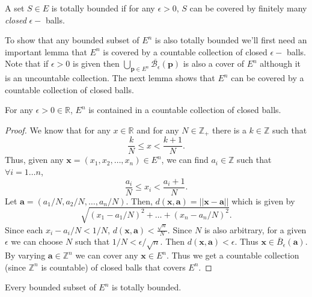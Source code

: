\begin{Definition}
    A set $S \in E$ is totally bounded if for any $\epsilon > 0$, $S$ can be covered by finitely
    many \emph{closed} $\epsilon -$ balls.
\end{Definition}
To show that any bounded subset of $E^n$ is also totally bounded we'll first need an important lemma
that $E^n$ is covered by a countable collection of closed $\epsilon -$ balls. Note that if $\epsilon
> 0$ is given then $\bigcup_{\mathbf{p} \in E^n}\overline{\mathcal{B}_{\epsilon}}(\mathbf{p})$ is
also a cover of $E^n$ although it is an uncountable collection. The next lemma shows that $E^n$ can
be covered by a countable collection of closed balls.
\begin{Lemma}[name=Covering $E^n$ by a countable collection of closed balls]
    For any $\epsilon > 0 \in \mathbb{R}$, $E^n$ is contained in a countable collection of closed
    balls.
\end{Lemma}
\begin{proof}
    We know that for any $x \in \mathbb{R}$ and for any $N \in \mathbb{Z}_+$ there is a $k \in
    \mathbb{Z}$ such that \[ \frac{k}{N} \leq x < \frac{k+1}{N} .\] Thus, given any $\mathbf{x} =
    \left(x_1,x_2,\dots,x_n\right) \in E^n$, we can find $a_i \in \mathbb{Z}$ such that $\forall i =
    1 \dots n$, \[ \frac{a_i}{N} \leq x_i < \frac{a_i+1}{N} .\] Let $\mathbf{a} =
    \left(a_1/N,a_2/N,\dots,a_n/N\right)$. Then, $d(\mathbf{x},\mathbf{a}) = \lvert\lvert \mathbf{x} -
    \mathbf{a} \rvert\rvert$ which is given by 
    \[\sqrt{\left(x_1 - a_1/N\right)^2 + \dots + \left(x_n - a_n/N\right)^2} .\] Since each $x_i -
    a_i/N < 1/N$, $d(\mathbf{x},\mathbf{a}) < \frac{\sqrt{n}}{N}$. Since $N$ is also arbitrary, for a
    given $\epsilon$ we can choose $N$ such that $1/N < \epsilon/ \sqrt{n}$. Then $
    d(\mathbf{x},\mathbf{a}) < \epsilon$. Thus $\mathbf{x} \in \overline{B}_{\epsilon}(\mathbf{a})$. 
    By varying $\mathbf{a} \in \mathbb{Z}^n$ we can cover any $\mathbf{x} \in E^n$. Thus we get a
    countable collection (since  $\mathbb{Z}^n$ is countable)  of closed balls that covers $E^n$.
\end{proof}
\begin{Lemma}[name=Bounded sets in $E^n$ are totally bounded]
    Every bounded subset of $E^n$ is totally bounded.
\end{Lemma}
